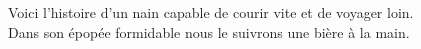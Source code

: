 Voici l'histoire d'un nain capable de courir vite et de voyager loin.\\
Dans son épopée formidable nous le suivrons une bière à la main.\\
